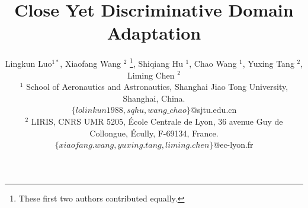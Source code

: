 \documentclass[10pt,twocolumn,letterpaper]{article}
\begin{document}
\begin{CJK*}{UTF8}{gkai}
\title{Close Yet Discriminative Domain Adaptation}
\author{Lingkun Luo$^{1\ast}$,   Xiaofang Wang $^{2}$ \thanks{These first two authors contributed equally.},   Shiqiang Hu $^{1}$, Chao Wang $^{1}$, Yuxing Tang $^{2}$, Liming Chen $^{2}$  \\
$^1 $ School of Aeronautics and Astronautics, Shanghai Jiao Tong University, Shanghai, China. \\ $\{lolinkun1988, sqhu, wang\_chao\}$@sjtu.edu.cn \\
$^2$  LIRIS, CNRS UMR 5205, \'Ecole Centrale de Lyon, 36 avenue Guy de Collongue, \'Ecully, F-69134, France. \\ $\{xiaofang.wang, yuxing.tang, liming.chen\}$@ec-lyon.fr
}
% 

\maketitle



\end{CJK*}
\end{document}

